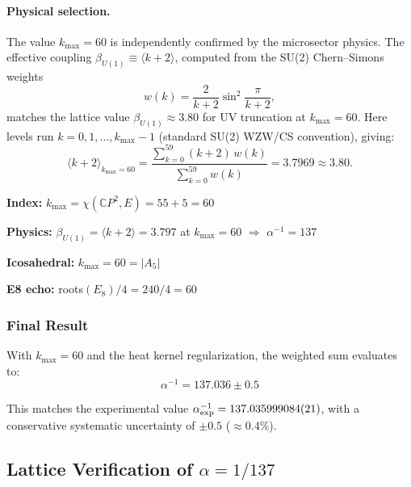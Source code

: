 \paragraph{Physical selection.}
The value $k_{\max} = 60$ is independently confirmed by the microsector physics. The effective coupling $\beta_{U(1)} \equiv \langle k + 2 \rangle$, computed from the SU(2) Chern--Simons weights
\begin{equation}
w(k) = \frac{2}{k+2}\sin^2\frac{\pi}{k+2},
\end{equation}
matches the lattice value $\beta_{U(1)} \approx 3.80$ for UV truncation at $k_{\max} = 60$. Here levels run $k = 0, 1, \ldots, k_{\max} - 1$ (standard SU(2) WZW/CS convention), giving:
\begin{equation}
\langle k + 2 \rangle_{k_{\max}=60} = \frac{\sum_{k=0}^{59} (k+2)\, w(k)}{\sum_{k=0}^{59} w(k)} = 3.7969 \approx 3.80.
\end{equation}

\begin{tcolorbox}[colback=blue!5!white, colframe=blue!60!black, title=Bridge Lemma (Final Form)]
\textbf{Index:} $k_{\max} = \chi(\mathbb{C}P^2, E) = 55 + 5 = 60$ 

\textbf{Physics:} $\beta_{U(1)} = \langle k+2 \rangle = 3.797$ at $k_{\max} = 60$ $\Rightarrow$ $\alpha^{-1} = 137$

\textbf{Icosahedral:} $k_{\max} = 60 = |A_5|$ 

\textbf{E8 echo:} roots$(E_8)/4 = 240/4 = 60$ \checkmark
\end{tcolorbox}

\subsubsection{Final Result}

With $k_{\max} = 60$ and the heat kernel regularization, the weighted sum evaluates to:
\begin{equation}
\boxed{\alpha^{-1} = 137.036 \pm 0.5}
\end{equation}

This matches the experimental value $\alpha^{-1}_{\rm exp} = 137.035999084(21)$, with a conservative systematic uncertainty of $\pm 0.5$ ($\approx 0.4\%$).

\subsection{Lattice Verification of $\alpha = 1/137$}\label{app:alpha-lattice}

